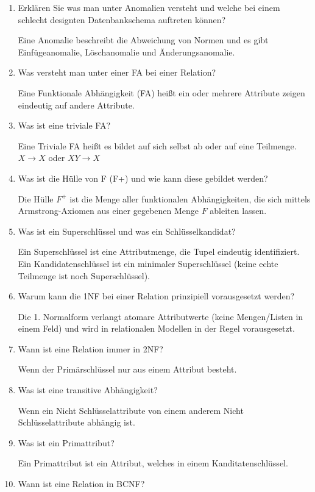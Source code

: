 \documentclass[a4paper]{article}
\begin{document}
\begin{enumerate}
    Zum aufdecken von Mängeln im Datenbankentwurf.
    \item Erklären Sie was man unter Anomalien versteht und welche bei einem schlecht designten Datenbankschema auftreten können?
    
    Eine Anomalie beschreibt die Abweichung von Normen und es gibt Einfügeanomalie, Löschanomalie und Änderungsanomalie.
    \item Was versteht man unter einer FA bei einer Relation?
    
    Eine Funktionale Abhängigkeit (FA) heißt ein oder mehrere Attribute zeigen eindeutig auf andere Attribute.
    \item Was ist eine triviale FA?
    
    Eine Triviale FA heißt es bildet auf sich selbst ab oder auf eine Teilmenge. $X\to X$ oder $XY\to X$
    \item Was ist die Hülle von F (F+) und wie kann diese gebildet werden?

    Die Hülle $F^+$ ist die Menge aller funktionalen Abhängigkeiten, die sich mittels Armstrong-Axiomen aus einer gegebenen Menge $F$ ableiten lassen.

    \newpage
    \item Was ist ein Superschlüssel und was ein Schlüsselkandidat?

    Ein Superschlüssel ist eine Attributmenge, die Tupel eindeutig identifiziert. Ein Kandidatenschlüssel ist ein minimaler Superschlüssel (keine echte Teilmenge ist noch Superschlüssel).
    \item Warum kann die 1NF bei einer Relation prinzipiell vorausgesetzt werden?

    Die 1. Normalform verlangt atomare Attributwerte (keine Mengen/Listen in einem Feld) und wird in relationalen Modellen in der Regel vorausgesetzt.
    \item Wann ist eine Relation immer in 2NF?
    
    Wenn der Primärschlüssel nur aus einem Attribut besteht.
    \item Was ist eine transitive Abhängigkeit?
    
    Wenn ein Nicht Schlüsselattribute von einem anderem Nicht Schlüsselattribute abhängig ist.
    \item Was ist ein Primattribut?
    
    Ein Primattribut ist ein Attribut, welches in einem Kanditatenschlüssel.
    \item Wann ist eine Relation in BCNF?
    

\end{enumerate}
\end{document}
